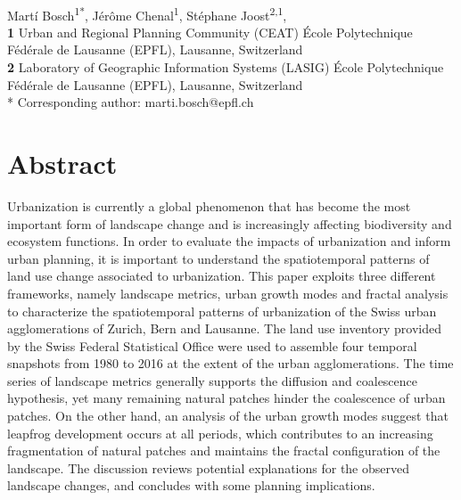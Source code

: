 \documentclass[10pt,letterpaper]{article}
\begin{document}
\vspace*{0.35in}

\begin{flushleft}
{\Large
\textbf{}
}
\newline
\\
Mart\'i Bosch\textsuperscript{1*},
J\'er\^ome Chenal\textsuperscript{1},
St\'ephane Joost\textsuperscript{2,1},
\\
\bigskip
\textbf{1} Urban and Regional Planning Community (CEAT) \'Ecole Polytechnique F\'ed\'erale de Lausanne (EPFL), Lausanne, Switzerland
\\
\textbf{2} Laboratory of Geographic Information Systems (LASIG) \'Ecole Polytechnique F\'ed\'erale de Lausanne (EPFL), Lausanne, Switzerland
\\
\bigskip
* Corresponding author: marti.bosch@epfl.ch

\end{flushleft}

\section*{Abstract}

Urbanization is currently a global phenomenon that has become the most important form of landscape change and is increasingly affecting biodiversity and ecosystem functions.
In order to evaluate the impacts of urbanization and inform urban planning, it is important to understand the spatiotemporal patterns of land use change associated to urbanization.
This paper exploits three different frameworks, namely landscape metrics, urban growth modes and fractal analysis to characterize the spatiotemporal patterns of urbanization of the Swiss urban agglomerations of Zurich, Bern and Lausanne. %
The land use inventory provided by the Swiss Federal Statistical Office were used to assemble four temporal snapshots from 1980 to 2016 at the extent of the urban agglomerations.
The time series of landscape metrics generally supports the diffusion and coalescence hypothesis, yet many remaining natural patches hinder the coalescence of urban patches.
On the other hand, an analysis of the urban growth modes suggest that leapfrog development occurs at all periods, which contributes to an increasing fragmentation of natural patches and maintains the fractal configuration of the landscape.
The discussion reviews potential explanations for the observed landscape changes, and concludes with some planning implications.
\end{document}
